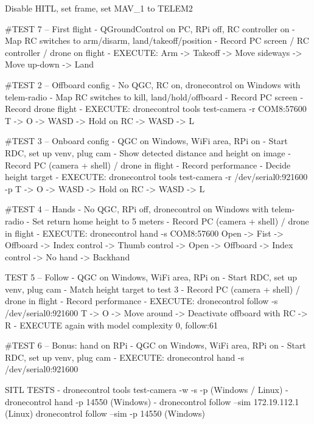 Disable HITL, set frame, set MAV_1 to TELEM2

#TEST 7  -- First flight
- QGroundControl on PC, RPi off, RC controller on
- Map RC switches to arm/disarm, land/takeoff/position
- Record PC screen / RC controller / drone on flight
- EXECUTE: Arm -> Takeoff -> Move sideways -> Move up-down -> Land

#TEST 2  -- Offboard config
- No QGC, RC on, dronecontrol on Windows with telem-radio
- Map RC switches to kill, land/hold/offboard
- Record PC screen
- Record drone flight
- EXECUTE: dronecontrol tools test-camera -r COM8:57600
           T -> O -> WASD -> Hold on RC -> WASD -> L

#TEST 3  -- Onboard config
- QGC on Windows, WiFi area, RPi on
- Start RDC, set up venv, plug cam
- Show detected distance and height on image
- Record PC (camera + shell) / drone in flight
- Record performance
- Decide height target
- EXECUTE: dronecontrol tools test-camera -r /dev/serial0:921600 -p
           T -> O -> WASD -> Hold on RC -> WASD -> L

#TEST 4  -- Hands
- No QGC, RPi off, dronecontrol on Windows with telem-radio
- Set return home height to 5 meters
- Record PC (camera + shell) / drone in flight
- EXECUTE: dronecontrol hand -s COM8:57600
           Open -> Fist -> Offboard -> Index control -> Thumb control -> Open -> Offboard -> Index control -> No hand -> Backhand


TEST 5  -- Follow
- QGC on Windows, WiFi area, RPi on
- Start RDC, set up venv, plug cam
- Match height target to test 3
- Record PC (camera + shell) / drone in flight
- Record performance
- EXECUTE: dronecontrol follow -s /dev/serial0:921600
            T -> O -> Move around -> Deactivate offboard with RC -> R
- EXECUTE again with model complexity 0, follow:61


#TEST 6  -- Bonus: hand on RPi
- QGC on Windows, WiFi area, RPi on
- Start RDC, set up venv, plug cam
- EXECUTE: dronecontrol hand -s /dev/serial0:921600








SITL TESTS
- dronecontrol tools test-camera -w -s -p  (Windows / Linux)
- dronecontrol hand -p 14550  (Windows)
- dronecontrol follow --sim 172.19.112.1 (Linux)
  dronecontrol follow --sim -p 14550 (Windows)